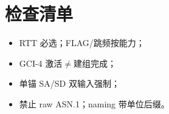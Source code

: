\documentclass[10pt,a4paper]{ctexart}
\begin{document}
\section{检查清单}
\begin{itemize}[nosep]
  \item RTT 必选；FLAG/跳频按能力；
  \item GCI-4 激活$\neq$建组完成；
  \item 单锚 SA/SD 双输入强制；
  \item 禁止 raw ASN.1；naming 带单位后缀。
\end{itemize}
\end{document}
